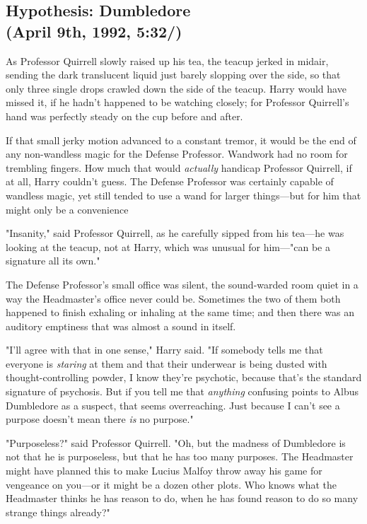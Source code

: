\subsection{Hypothesis: Dumbledore\\
(April 9th, 1992, 5:32\PM/)}

As Professor Quirrell slowly raised up his tea, the teacup jerked in midair,
sending the dark translucent liquid just barely slopping over the side, so that
only three single drops crawled down the side of the teacup. Harry would have
missed it, if he hadn't happened to be watching closely; for Professor
Quirrell's hand was perfectly steady on the cup before and after.

If that small jerky motion advanced to a constant tremor, it would be the end
of any non-wandless magic for the Defense Professor. Wandwork had no room for
trembling fingers. How much that would \emph{actually} handicap Professor
Quirrell, if at all, Harry couldn't guess. The Defense Professor was certainly
capable of wandless magic, yet still tended to use a wand for larger
things---but for him that might only be a convenience{\el}

"Insanity," said Professor Quirrell, as he carefully sipped from his tea---he
was looking at the teacup, not at Harry, which was unusual for him---"can be a
signature all its own."

The Defense Professor's small office was silent, the sound-warded room quiet in
a way the Headmaster's office never could be. Sometimes the two of them both
happened to finish exhaling or inhaling at the same time; and then there was an
auditory emptiness that was almost a sound in itself.

"I'll agree with that in one sense," Harry said. "If somebody tells me that
everyone is \emph{staring} at them and that their underwear is being dusted
with thought-controlling powder, I know they're psychotic, because that's the
standard signature of psychosis. But if you tell me that \emph{anything}
confusing points to Albus Dumbledore as a suspect, that seems{\el}
overreaching. Just because I can't see a purpose doesn't mean there \emph{is}
no purpose."

"Purposeless?" said Professor Quirrell. "Oh, but the madness of Dumbledore is
not that he is purposeless, but that he has too many purposes. The Headmaster
might have planned this to make Lucius Malfoy throw away his game for vengeance
on you---or it might be a dozen other plots. Who knows what the Headmaster
thinks he has reason to do, when he has found reason to do so many strange
things already?"

